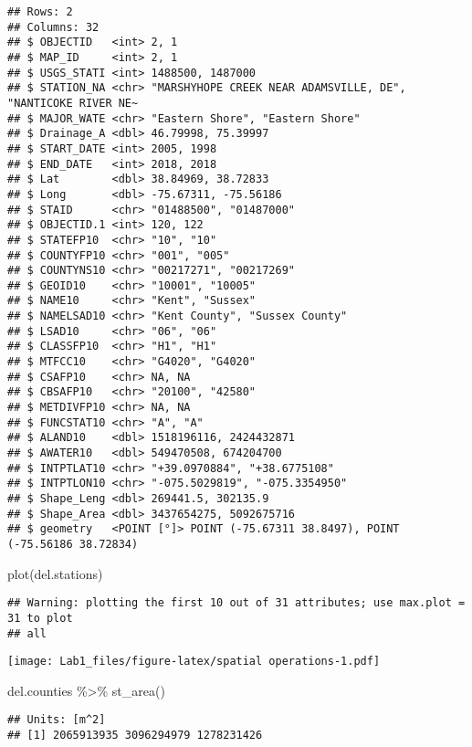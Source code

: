 \documentclass[
]{article}
\newenvironment{Shaded}{\begin{snugshade}}{\end{snugshade}}
\newcommand{\FunctionTok}[1]{\textcolor[rgb]{0.00,0.00,0.00}{#1}}
\newcommand{\NormalTok}[1]{#1}
\newcommand{\SpecialCharTok}[1]{\textcolor[rgb]{0.00,0.00,0.00}{#1}}
\begin{document}
\begin{verbatim}
## Rows: 2
## Columns: 32
## $ OBJECTID   <int> 2, 1
## $ MAP_ID     <int> 2, 1
## $ USGS_STATI <int> 1488500, 1487000
## $ STATION_NA <chr> "MARSHYHOPE CREEK NEAR ADAMSVILLE, DE", "NANTICOKE RIVER NE~
## $ MAJOR_WATE <chr> "Eastern Shore", "Eastern Shore"
## $ Drainage_A <dbl> 46.79998, 75.39997
## $ START_DATE <int> 2005, 1998
## $ END_DATE   <int> 2018, 2018
## $ Lat        <dbl> 38.84969, 38.72833
## $ Long       <dbl> -75.67311, -75.56186
## $ STAID      <chr> "01488500", "01487000"
## $ OBJECTID.1 <int> 120, 122
## $ STATEFP10  <chr> "10", "10"
## $ COUNTYFP10 <chr> "001", "005"
## $ COUNTYNS10 <chr> "00217271", "00217269"
## $ GEOID10    <chr> "10001", "10005"
## $ NAME10     <chr> "Kent", "Sussex"
## $ NAMELSAD10 <chr> "Kent County", "Sussex County"
## $ LSAD10     <chr> "06", "06"
## $ CLASSFP10  <chr> "H1", "H1"
## $ MTFCC10    <chr> "G4020", "G4020"
## $ CSAFP10    <chr> NA, NA
## $ CBSAFP10   <chr> "20100", "42580"
## $ METDIVFP10 <chr> NA, NA
## $ FUNCSTAT10 <chr> "A", "A"
## $ ALAND10    <dbl> 1518196116, 2424432871
## $ AWATER10   <dbl> 549470508, 674204700
## $ INTPTLAT10 <chr> "+39.0970884", "+38.6775108"
## $ INTPTLON10 <chr> "-075.5029819", "-075.3354950"
## $ Shape_Leng <dbl> 269441.5, 302135.9
## $ Shape_Area <dbl> 3437654275, 5092675716
## $ geometry   <POINT [°]> POINT (-75.67311 38.8497), POINT (-75.56186 38.72834)
\end{verbatim}

\begin{Shaded}
\begin{Highlighting}[]
\FunctionTok{plot}\NormalTok{(del.stations)}
\end{Highlighting}
\end{Shaded}

\begin{verbatim}
## Warning: plotting the first 10 out of 31 attributes; use max.plot = 31 to plot
## all
\end{verbatim}

\texttt{[image: Lab1\_files/figure-latex/spatial operations-1.pdf]}

\begin{Shaded}
\begin{Highlighting}[]
\NormalTok{del.counties }\SpecialCharTok{\%\textgreater{}\%} \FunctionTok{st\_area}\NormalTok{()}
\end{Highlighting}
\end{Shaded}

\begin{verbatim}
## Units: [m^2]
## [1] 2065913935 3096294979 1278231426
\end{verbatim}
\end{document}
